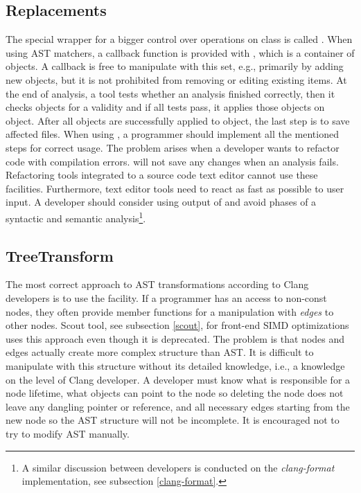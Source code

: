 \subsection{Replacements}
The special wrapper for a bigger control over operations on  class is called  . When using AST matchers, a callback function is provided with , which is a container of  objects. A callback is free to manipulate with this set, e.g., primarily by adding new objects, but it is not prohibited from removing or editing existing items. At the end of analysis, a tool tests whether an analysis finished correctly, then it checks  objects for a validity and if all tests pass, it applies those objects on  object. After all  objects are successfully applied to  object, the last step is to save affected files. When using , a programmer should implement all the mentioned steps for correct usage. The problem arises when a developer wants to refactor code with compilation errors.  will not save any changes when an analysis fails. Refactoring tools integrated to a source code text editor cannot use these facilities. Furthermore, text editor tools need to react as fast as possible to user input. A developer should consider using output of  and avoid phases of a syntactic and semantic analysis\footnote{A similar discussion between developers is conducted on the \emph{clang-format} implementation, see subsection \ref{clang-format}.}.

\subsection{TreeTransform}
The most correct approach to AST transformations according to Clang developers is to use the  facility. If a programmer has an access to non-const nodes, they often provide member functions for a manipulation with \textit{edges} to other nodes. Scout tool, see subsection \ref{scout}, for front-end SIMD optimizations uses this approach even though it is deprecated. The problem is that nodes and edges actually create more complex structure than AST. It is difficult to manipulate with this structure without its detailed knowledge, i.e., a knowledge on the level of Clang developer. A developer must know what is responsible for a node lifetime, what objects can point to the node so deleting the node does not leave any dangling pointer or reference, and all necessary edges starting from the new node so the AST structure will not be incomplete. It is encouraged not to try to modify AST manually.

